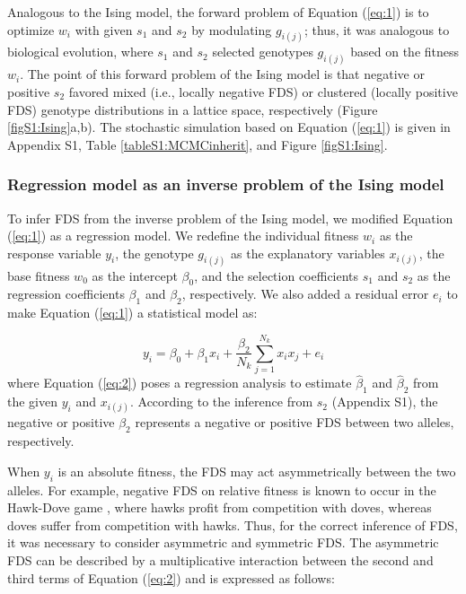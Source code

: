 \documentclass[12pt,]{article}
\begin{document}
Analogous to the Ising model, the forward problem of Equation (\ref{eq:1}) is to optimize $w_i$ with given $s_1$ and $s_2$ by modulating $g_{i(j)}$; thus, it was analogous to biological evolution, where $s_1$ and $s_2$ selected genotypes $g_{i(j)}$ based on the fitness $w_i$. The point of this forward problem of the Ising model is that negative or positive $s_2$ favored mixed (i.e., locally negative FDS) or clustered (locally positive FDS) genotype distributions in a lattice space, respectively (Figure \ref{figS1:Ising}a,b). The stochastic simulation based on Equation (\ref{eq:1}) is given in Appendix S1, Table \ref{tableS1:MCMCinherit}, and Figure \ref{figS1:Ising}.


\subsubsection{Regression model as an inverse problem of the Ising model}

To infer FDS from the inverse problem of the Ising model, we modified Equation (\ref{eq:1}) as a regression model. We redefine the individual fitness $w_i$ as the response variable $y_i$, the genotype $g_{i(j)}$ as the explanatory variables $x_{i(j)}$, the base fitness $w_0$ as the intercept $\beta_0$, and the selection coefficients $s_1$ and $s_2$ as the regression coefficients $\beta_1$ and $\beta_2$, respectively. We also added a residual error $e_i$ to make Equation (\ref{eq:1}) a statistical model as: 

\begin{equation}
y_i = \beta_0 + \beta_1x_i + \frac{\beta_2}{N_k}\sum^{N_{k}}_{j=1}{x_ix_j} + e_i \label{eq:2}
\end{equation}
\noindent
where Equation (\ref{eq:2}) poses a regression analysis to estimate $\hat{\beta}_1$ and $\hat{\beta}_2$ from the given $y_i$ and $x_{i(j)}$. According to the inference from $s_2$ (Appendix S1), the negative or positive $\beta_2$ represents a negative or positive FDS between two alleles, respectively. 

When $y_i$ is an absolute fitness, the FDS may act asymmetrically between the two alleles. For example, negative FDS on relative fitness is known to occur in the Hawk-Dove game \citep{takahashi2018balanced}, where hawks profit from competition with doves, whereas doves suffer from competition with hawks. Thus, for the correct inference of FDS, it was necessary to consider asymmetric and symmetric FDS. The asymmetric FDS can be described by a multiplicative interaction between the second and third terms of Equation (\ref{eq:2}) \citep{sato2019neighbor} and is expressed as follows:
\end{document}
